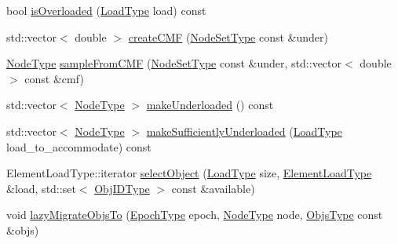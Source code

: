 \begin{DoxyCompactItemize}
\item 
bool \hyperlink{structvt_1_1vrt_1_1collection_1_1lb_1_1_tempered_l_b_ab737fad35804f7a6db9ae67a7a5fa982}{is\+Overloaded} (\hyperlink{structvt_1_1vrt_1_1collection_1_1lb_1_1_base_l_b_a215e22b9f12678303f49615ae3be05cc}{Load\+Type} load) const
\item 
std\+::vector$<$ double $>$ \hyperlink{structvt_1_1vrt_1_1collection_1_1lb_1_1_tempered_l_b_add46961d85ddad906cfd66aba09a0bd1}{create\+C\+MF} (\hyperlink{structvt_1_1vrt_1_1collection_1_1lb_1_1_tempered_l_b_aa18a0edaf10119e307e7209371caa673}{Node\+Set\+Type} const \&under)
\item 
\hyperlink{namespacevt_a866da9d0efc19c0a1ce79e9e492f47e2}{Node\+Type} \hyperlink{structvt_1_1vrt_1_1collection_1_1lb_1_1_tempered_l_b_a674736589bb2c1cadba7516e0bf598b9}{sample\+From\+C\+MF} (\hyperlink{structvt_1_1vrt_1_1collection_1_1lb_1_1_tempered_l_b_aa18a0edaf10119e307e7209371caa673}{Node\+Set\+Type} const \&under, std\+::vector$<$ double $>$ const \&cmf)
\item 
std\+::vector$<$ \hyperlink{namespacevt_a866da9d0efc19c0a1ce79e9e492f47e2}{Node\+Type} $>$ \hyperlink{structvt_1_1vrt_1_1collection_1_1lb_1_1_tempered_l_b_af3c49d726cab946d817f87ee94b417a2}{make\+Underloaded} () const
\item 
std\+::vector$<$ \hyperlink{namespacevt_a866da9d0efc19c0a1ce79e9e492f47e2}{Node\+Type} $>$ \hyperlink{structvt_1_1vrt_1_1collection_1_1lb_1_1_tempered_l_b_a946bd9c5a6591f8494ecd11be5092ef0}{make\+Sufficiently\+Underloaded} (\hyperlink{structvt_1_1vrt_1_1collection_1_1lb_1_1_base_l_b_a215e22b9f12678303f49615ae3be05cc}{Load\+Type} load\+\_\+to\+\_\+accommodate) const
\item 
Element\+Load\+Type\+::iterator \hyperlink{structvt_1_1vrt_1_1collection_1_1lb_1_1_tempered_l_b_a191c3b0d3f7a06de4510b1c3370eabc2}{select\+Object} (\hyperlink{structvt_1_1vrt_1_1collection_1_1lb_1_1_base_l_b_a215e22b9f12678303f49615ae3be05cc}{Load\+Type} size, \hyperlink{structvt_1_1vrt_1_1collection_1_1lb_1_1_base_l_b_aa286d31a0820a8fc9218ccb858368fca}{Element\+Load\+Type} \&load, std\+::set$<$ \hyperlink{structvt_1_1vrt_1_1collection_1_1lb_1_1_base_l_b_a790b22acf448880599724749cdc4e9b3}{Obj\+I\+D\+Type} $>$ const \&available)
\item 
void \hyperlink{structvt_1_1vrt_1_1collection_1_1lb_1_1_tempered_l_b_a00af3637cea1d345fea518d2608d5596}{lazy\+Migrate\+Objs\+To} (\hyperlink{namespacevt_a985a5adf291c34a3ca263b3378388236}{Epoch\+Type} epoch, \hyperlink{namespacevt_a866da9d0efc19c0a1ce79e9e492f47e2}{Node\+Type} node, \hyperlink{structvt_1_1vrt_1_1collection_1_1lb_1_1_tempered_l_b_ad54faf59319f1b33dec689ee853d688e}{Objs\+Type} const \&objs)

\end{DoxyCompactItemize}
